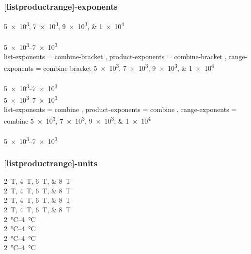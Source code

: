 \documentclass{article}
\begin{document}
\subsubsection{[list\textbar product\textbar range]-exponents}
\numlist{5e3;7e3;9e3;1e4} \\
 \\
\numrange{5e3}{7e3} \\
{
\sisetup
{
list-exponents = combine-bracket ,
product-exponents = combine-bracket ,
range-exponents = combine-bracket
}
\numlist{5e3;7e3;9e3;1e4} \\
 \\
\numrange{5e3}{7e3} \\
\numrange[range-open-phrase={\text{from }}]{5e3}{7e3} \\
\sisetup
{
list-exponents = combine ,
product-exponents = combine ,
range-exponents = combine
}
\numlist{5e3;7e3;9e3;1e4} \\
 \\
\numrange{5e3}{7e3}
}

\subsubsection{[list\textbar product\textbar range]-units}
\qtylist{2;4;6;8}{\tesla} \\
\qtylist[list-units = bracket]{2;4;6;8}{\tesla} \\
\qtylist[list-units = repeat]{2;4;6;8}{\tesla} \\
\qtylist[list-units = single]{2;4;6;8}{\tesla} \\
\qtyrange{2}{4}{\degreeCelsius} \\
\qtyrange[range-units = bracket]{2}{4}{\degreeCelsius} \\
\qtyrange[range-units = repeat]{2}{4}{\degreeCelsius} \\
\qtyrange[range-units = single]{2}{4}{\degreeCelsius}\\
 \\
\\
\\
\\
\\
\end{document}
